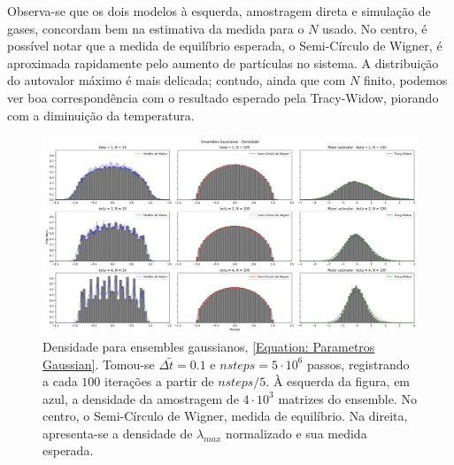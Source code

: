 Observa-se que os dois modelos à esquerda, amostragem direta e simulação de gases, concordam bem na estimativa da medida para o $N$ usado. No centro, é possível notar que a medida de equilíbrio esperada, o Semi-Círculo de Wigner, é aproximada rapidamente pelo aumento de partículas no sistema. A distribuição do autovalor máximo é mais delicada; contudo, ainda que com $N$ finito, podemos ver boa correspondência com o resultado esperado pela Tracy-Widow, piorando com a diminuição da temperatura.
\begin{figure}[ht!]
	\centering
	\includegraphics[width=\textwidth]{Assets/validationGaussianTracy.png}
	\caption{Densidade para ensembles gaussianos, \eqref{Equation: Parametros Gaussian}. Tomou-se $\Delta \tilde{t} = 0.1$ e $nsteps = 5\cdot10^6$ passos, registrando a cada $100$ iterações a partir de $nsteps/5$. À esquerda da figura, em azul, a densidade da amostragem de $4\cdot10^3$ matrizes do ensemble. No centro, o Semi-Círculo de Wigner, medida de equilíbrio. Na direita, apresenta-se a densidade de $\lambda_{max}$ normalizado e sua medida esperada.}
	\label{Figura: Gaussian}
\end{figure}

